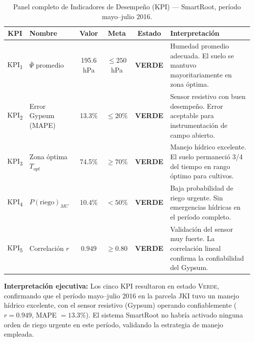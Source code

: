 \documentclass[12pt,a4paper]{article}
\begin{document}
\begin{table}[H]
\centering
\small
\caption{Panel completo de Indicadores de Desempeño (KPI) --- SmartRoot, período mayo--julio 2016.}
\label{tab:kpi_completo}
\begin{tabularx}{\textwidth}{@{}clcccX@{}}
\toprule
\textbf{KPI} & \textbf{Nombre} & \textbf{Valor} & \textbf{Meta} & \textbf{Estado} & \textbf{Interpretación} \\
\midrule
KPI\textsubscript{1} & $\bar{\Psi}$ promedio & 195.6 hPa & $\leq 250$ hPa & \cellcolor{verdeKPI!30}\textcolor{verdeKPI!70!black}{\textbf{VERDE}} & Humedad promedio adecuada. El suelo se mantuvo mayoritariamente en zona óptima. \\[4pt]

KPI\textsubscript{2} & Error Gypsum (MAPE) & 13.3\% & $\leq 20\%$ & \cellcolor{verdeKPI!30}\textcolor{verdeKPI!70!black}{\textbf{VERDE}} & Sensor resistivo con buen desempeño. Error aceptable para instrumentación de campo abierto. \\[4pt]

KPI\textsubscript{3} & Zona óptima $T_{opt}$ & 74.5\% & $\geq 70\%$ & \cellcolor{verdeKPI!30}\textcolor{verdeKPI!70!black}{\textbf{VERDE}} & Manejo hídrico excelente. El suelo permaneció 3/4 del tiempo en rango óptimo para cultivos. \\[4pt]

KPI\textsubscript{4} & $P(\text{riego})_{MC}$ & 10.4\% & $< 50\%$ & \cellcolor{verdeKPI!30}\textcolor{verdeKPI!70!black}{\textbf{VERDE}} & Baja probabilidad de riego urgente. Sin emergencias hídricas en el período completo. \\[4pt]

KPI\textsubscript{5} & Correlación $r$ & $0.949$ & $\geq 0.80$ & \cellcolor{verdeKPI!30}\textcolor{verdeKPI!70!black}{\textbf{VERDE}} & Validación del sensor muy fuerte. La correlación lineal confirma la confiabilidad del Gypsum. \\
\bottomrule
\end{tabularx}
\end{table}

\begin{infobox}
\textbf{Interpretación ejecutiva:} Los cinco KPI resultaron en estado \textsc{Verde}, confirmando que el período mayo--julio 2016 en la parcela JKI tuvo un manejo hídrico excelente, con el sensor resistivo (Gypsum) operando confiablemente ($r = 0.949$, MAPE $= 13.3\%$). El sistema SmartRoot no habría activado ninguna orden de riego urgente en este período, validando la estrategia de manejo empleada.
\end{infobox}
\end{document}
